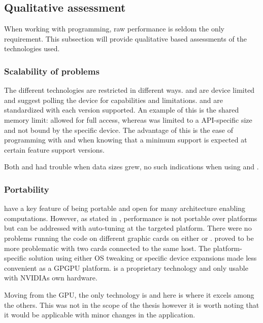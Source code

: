 \subsection{Qualitative assessment}

When working with programming, raw performance is seldom the only requirement. This subsection will provide qualitative based assessments of the technologies used.

\subsubsection{Scalability of problems}

The different technologies are restricted in different ways. {\CU} and {\OCL} are device limited and suggest polling the device for capabilities and limitations. {\DX} and {\GL} are standardized with each version supported. An example of this is the shared memory limit: {\CU} allowed for full access, whereas {\DX} was limited to a \gls{API}-specific size and not bound by the specific device. The advantage of this is the ease of programming with {\DX} and {\GL} when knowing that a minimum support is expected at certain feature support versions.

Both {\DX} and {\GL} had trouble when data sizes grew, no such indications when using {\CU} and {\OCL}.

\subsubsection{Portability}

{\OCL} have a key feature of being portable and open for many architecture enabling computations. However, as stated in \cite{fang2011comprehensive, du2012cuda}, performance is not portable over platforms but can be addressed with auto-tuning at the targeted platform. There were no problems running the code on different graphic cards on either {\OCL} or {\DX}. {\GL} proved to be more problematic with two cards connected to the same host. The platform-specific solution using either \gls{OS} tweaking or specific device {\GL} expansions made {\GL} less convenient as a GPGPU platform. {\CU} is a proprietary technology and only usable with NVIDIAs own hardware.

Moving from the \gls{GPU}, the only technology is {\OCL} and here is where it excels among the others. This was not in the scope of the thesis however it is worth noting that it would be applicable with minor changes in the application.

